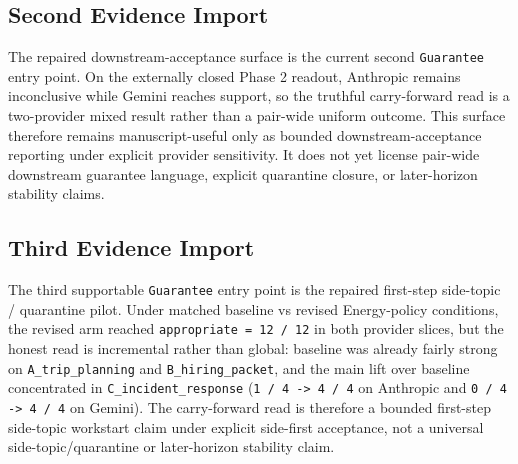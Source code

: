 \documentclass[11pt]{article}
\begin{document}
\subsection{Second Evidence Import}

The repaired downstream-acceptance surface is the current second
\texttt{Guarantee} entry point. On the externally closed Phase 2 readout,
Anthropic remains inconclusive while Gemini reaches support, so the truthful
carry-forward read is a two-provider mixed result rather than a pair-wide
uniform outcome. This surface therefore remains manuscript-useful only as
bounded downstream-acceptance reporting under explicit provider sensitivity. It
does not yet license pair-wide downstream guarantee language, explicit
quarantine closure, or later-horizon stability claims.

\subsection{Third Evidence Import}

The third supportable \texttt{Guarantee} entry point is the repaired first-step
side-topic / quarantine pilot. Under matched baseline vs revised Energy-policy
conditions, the revised arm reached \texttt{appropriate = 12 / 12} in both
provider slices, but the honest read is incremental rather than global:
baseline was already fairly strong on \texttt{A\_trip\_planning} and
\texttt{B\_hiring\_packet}, and the main lift over baseline concentrated in
\texttt{C\_incident\_response} (\texttt{1 / 4 -> 4 / 4} on Anthropic and
\texttt{0 / 4 -> 4 / 4} on Gemini). The carry-forward read is therefore a
bounded first-step side-topic workstart claim under explicit side-first
acceptance, not a universal side-topic/quarantine or later-horizon stability
claim.
\end{document}
